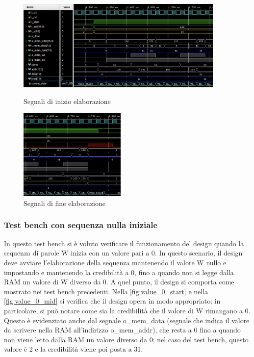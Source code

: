 \documentclass[11pt,a4paper]{article}
\newcommand{\m}[1]{{\fontfamily{zi4}\selectfont #1}}
\begin{document}
\vspace{0.5em}
\begin{figure}[htbp]
    \centering
    \begin{minipage}{0.6\textwidth}
        \centering
        \includegraphics[height=4.5cm]{resources/cred_0_start.png}
        \caption{Segnali di inizio elaborazione}
        \label{fig:cred_0_start}
    \end{minipage}\hfill
    \begin{minipage}{0.4\textwidth}
        \centering
        \includegraphics[height=4.5cm]{resources/cred_0_end.png}
        \caption{Segnali di fine elaborazione}
        \label{fig:cred_0_end}
    \end{minipage}
    \label{fig:cred_0_sequence}
\end{figure}

\subsubsection{Test bench con sequenza nulla iniziale}
In questo test bench si è voluto verificare il funzionamento del design quando la sequenza di parole \m{W} inizia con un valore pari a 0. In questo scenario, il design deve avviare l'elaborazione della sequenza mantenendo il valore \m{W} nullo e impostando e mantenendo la credibilità a 0, fino a quando non si legge dalla RAM un valore di \m{W} diverso da 0. A quel punto, il design si comporta come mostrato nei test bench precedenti. Nella \autoref{fig:value_0_start} e nella \autoref{fig:value_0_mid} si verifica che il design opera in modo appropriato: in particolare, si può notare come sia la credibilità che il valore di \m{W} rimangano a 0. Questo è evidenziato anche dal segnale \m{o\_mem\_data} (segnale che indica il valore da scrivere nella RAM all'indirizzo \m{o\_mem\_addr}), che resta a 0 fino a quando non viene letto dalla RAM un valore diverso da 0; nel caso del test bench, questo valore è 2 e la credibilità viene poi posta a 31.
\end{document}
